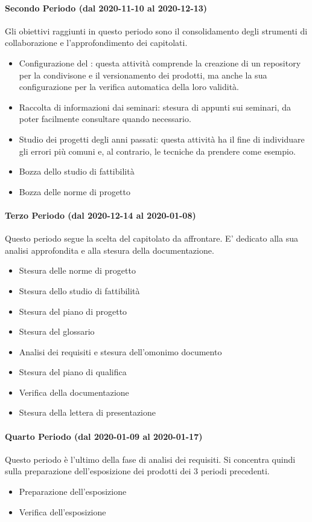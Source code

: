 \paragraph{Secondo Periodo (dal 2020-11-10 al 2020-12-13)}
Gli obiettivi raggiunti in questo periodo sono il consolidamento degli strumenti di collaborazione e l'approfondimento dei capitolati.
\begin{itemize}
	\item Configurazione del : questa attività comprende la creazione di un repository per la condivisone e il versionamento dei prodotti, ma anche la sua configurazione per la verifica automatica della loro validità.
	\item Raccolta di informazioni dai seminari: stesura di appunti sui seminari, da poter facilmente consultare quando necessario.
	\item Studio dei progetti degli anni passati: questa attività ha il fine di individuare gli errori più comuni e, al contrario, le tecniche da prendere come esempio.
	\item Bozza dello studio di fattibilità
	\item Bozza delle norme di progetto
\end{itemize}

\paragraph{Terzo Periodo (dal 2020-12-14 al 2020-01-08)}
Questo periodo segue la scelta del capitolato da affrontare. E' dedicato alla sua analisi approfondita e alla stesura della documentazione. 
\begin{itemize}
	\item Stesura delle norme di progetto
	\item Stesura dello studio di fattibilità
	\item Stesura del piano di progetto
	\item Stesura del glossario
	\item Analisi dei requisiti e stesura dell'omonimo documento
	\item Stesura del piano di qualifica
	\item Verifica della documentazione
	\item Stesura della lettera di presentazione
\end{itemize}

\paragraph{Quarto Periodo (dal 2020-01-09 al 2020-01-17)}
Questo periodo è l'ultimo della fase di analisi dei requisiti. Si concentra quindi sulla preparazione dell'esposizione dei prodotti dei 3 periodi precedenti.
\begin{itemize}
	\item Preparazione dell'esposizione
	\item Verifica dell'esposizione
\end{itemize}


